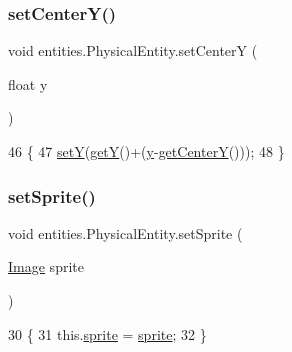 \subsubsection{\texorpdfstring{set\+Center\+Y()}{setCenterY()}}
{\footnotesize\ttfamily void entities.\+Physical\+Entity.\+set\+CenterY (\begin{DoxyParamCaption}\item[{float}]{y }\end{DoxyParamCaption})\hspace{0.3cm}{\ttfamily [inline]}}


\begin{DoxyCode}
46                                    \{
47         \mbox{\hyperlink{classorg_1_1newdawn_1_1slick_1_1geom_1_1_shape_a7a127d0dea9bd7f0e3ce3fd0a61268fc}{setY}}(\mbox{\hyperlink{classorg_1_1newdawn_1_1slick_1_1geom_1_1_shape_a5f334f962d8fc525d522fe0f8ac20b35}{getY}}()+(\mbox{\hyperlink{classorg_1_1newdawn_1_1slick_1_1geom_1_1_shape_a9f934baded6a1b65ebb69e7e5f80ea00}{y}}-\mbox{\hyperlink{classentities_1_1_physical_entity_a5786e06f692199c9169b64eca2885683}{getCenterY}}()));
48     \}
\end{DoxyCode}
\mbox{\label{classentities_1_1_physical_entity_a34d2f58a6004cbc4640ce0d61f1341d6}} 
\subsubsection{\texorpdfstring{set\+Sprite()}{setSprite()}}
{\footnotesize\ttfamily void entities.\+Physical\+Entity.\+set\+Sprite (\begin{DoxyParamCaption}\item[{\mbox{\hyperlink{classorg_1_1newdawn_1_1slick_1_1_image}{Image}}}]{sprite }\end{DoxyParamCaption})\hspace{0.3cm}{\ttfamily [inline]}}


\begin{DoxyCode}
30                                         \{
31         this.\mbox{\hyperlink{classentities_1_1_physical_entity_aeb439b2308ab19fb6d3ff6be6f7cdbd8}{sprite}} = \mbox{\hyperlink{classentities_1_1_physical_entity_aeb439b2308ab19fb6d3ff6be6f7cdbd8}{sprite}};
32     \}
\end{DoxyCode}


